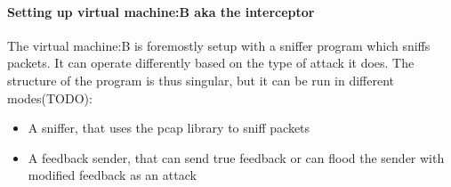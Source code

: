 \documentclass[a4paper,11pt]{article}
\begin{document}
\paragraph{Setting up virtual machine:B aka the interceptor}
The virtual machine:B is foremostly setup with a sniffer program which sniffs packets.
It can operate differently based on the type of attack it does. The structure of the program is thus singular, but it can be run 
in different modes(TODO):
\begin{itemize}
	\item A sniffer, that uses the pcap library to sniff packets 
	\item A feedback sender, that can send true feedback or can flood the sender with modified feedback as an attack
\end{itemize}
\end{document}
